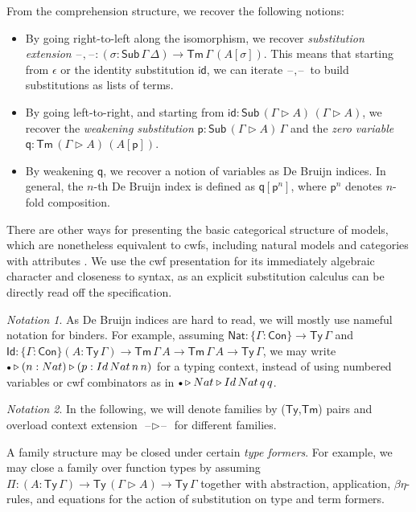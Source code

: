 \documentclass[a4paper,UKenglish,cleveref, autoref, thm-restate]{lipics-v2021}
\theoremstyle{remark}
\newtheorem{notation}{Notation}
\theoremstyle{definition}
\newcommand{\Con}{\mathsf{Con}}
\newcommand{\Ty}{\mathsf{Ty}}
\newcommand{\Tm}{\mathsf{Tm}}
\newcommand{\Sub}{\mathsf{Sub}}
\newcommand{\emptycon}{\scaleobj{.75}\bullet}
\newcommand{\id}{\mathsf{id}}
\newcommand{\ext}{\triangleright}
\newcommand{\blank}{\mathord{\hspace{1pt}\text{--}\hspace{1pt}}}
\newcommand{\p}{\mathsf{p}}
\newcommand{\q}{\mathsf{q}}
\newcommand{\Id}{\mathsf{Id}}
\newcommand{\Nat}{\mathsf{Nat}}
\begin{document}
\noindent From the comprehension structure, we recover the following notions:

\begin{itemize}
\item By going right-to-left along the isomorphism, we recover \emph{substitution extension}
      $\blank,\blank : (\sigma : \Sub\,\Gamma\,\Delta) \to \Tm\,\Gamma\,(A[\sigma])$. This means
      that starting from $\epsilon$ or the identity substitution $\id$, we can iterate $\blank,\blank$
      to build substitutions as lists of terms.
\item By going left-to-right, and starting from $\id : \Sub\,(\Gamma\ext A)\,(\Gamma\ext A)$, we recover
      the \emph{weakening substitution} $\p : \Sub\,(\Gamma\ext A)\,\Gamma$ and the \emph{zero variable}
      $\q : \Tm\,(\Gamma\ext A)\,(A[\p])$.
\item By weakening $\q$, we recover a notion of variables as De Bruijn indices. In general, the $n$-th
      De Bruijn index is defined as $\q[\p^{n}]$, where $\p^{n}$ denotes $n$-fold composition.
\end{itemize}

There are other ways for presenting the basic categorical structure of models,
which are nonetheless equivalent to cwfs, including natural models \cite{awodey18natural}
and categories with attributes \cite{cartmellthesis}. We use the cwf presentation for its
immediately algebraic character and closeness to syntax, as an explicit
substitution calculus can be directly read off the specification.

\begin{notation}As De Bruijn indices are hard to read, we will mostly use
nameful notation for binders. For example, assuming $\Nat : \{\Gamma : \Con\}
\to \Ty\,\Gamma$ and $\Id : \{\Gamma : \Con\}(A : \Ty\,\Gamma) \to
\Tm\,\Gamma\,A \to \Tm\,\Gamma\,A \to \Ty\,\Gamma$, we may write $\emptycon \ext
(n : \Nat) \ext (p : \Id\,\Nat\,n\,n)$ for a typing context, instead of using
numbered variables or cwf combinators as in $\emptycon \ext \Nat \ext
\Id\,\Nat\,\q\,\q$.
\end{notation}

\begin{notation}
In the following, we will denote families by ($\Ty$,$\Tm$) pairs and overload context
extension $\blank\ext\blank$ for different families.
\end{notation}

A family structure may be closed under certain \emph{type formers}. For example,
we may close a family over function types by assuming $\Pi : (A : \Ty\,\Gamma)
\to \Ty\,(\Gamma\ext A) \to \Ty\,\Gamma$ together with abstraction, application,
$\beta\eta$-rules, and equations for the action of substitution on type and term
formers.
\end{document}
